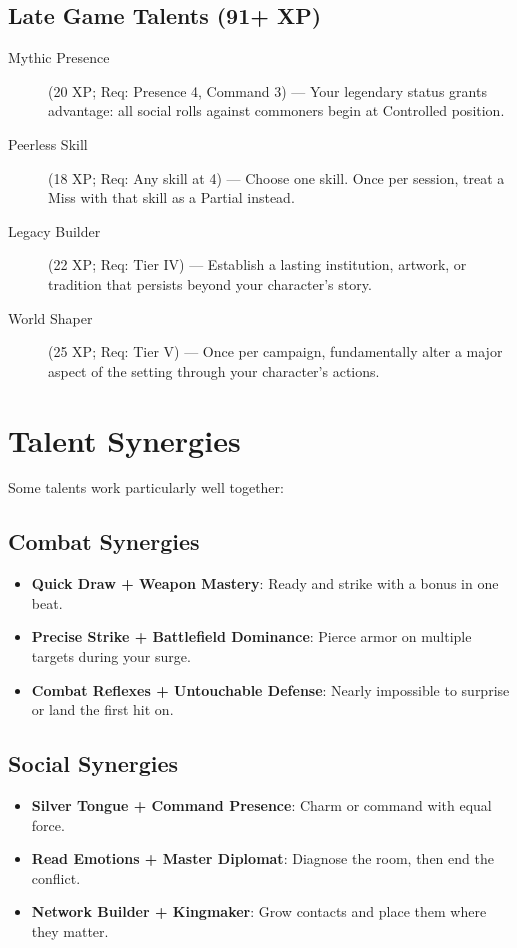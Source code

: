 \subsection*{Late Game Talents (91+ XP)}
\begin{description}
\item[Mythic Presence] (20 XP; Req: Presence 4, Command 3) --- Your legendary status grants advantage: all social rolls against commoners begin at Controlled position.
\item[Peerless Skill] (18 XP; Req: Any skill at 4) --- Choose one skill. Once per session, treat a Miss with that skill as a Partial instead.
\item[Legacy Builder] (22 XP; Req: Tier IV) --- Establish a lasting institution, artwork, or tradition that persists beyond your character's story.
\item[World Shaper] (25 XP; Req: Tier V) --- Once per campaign, fundamentally alter a major aspect of the setting through your character's actions.
\end{description}

\section{Talent Synergies}

Some talents work particularly well together:

\subsection*{Combat Synergies}
\begin{itemize}
\item \textbf{Quick Draw + Weapon Mastery}: Ready and strike with a bonus in one beat.
\item \textbf{Precise Strike + Battlefield Dominance}: Pierce armor on multiple targets during your surge.
\item \textbf{Combat Reflexes + Untouchable Defense}: Nearly impossible to surprise or land the first hit on.
\end{itemize}

\subsection*{Social Synergies}
\begin{itemize}
\item \textbf{Silver Tongue + Command Presence}: Charm or command with equal force.
\item \textbf{Read Emotions + Master Diplomat}: Diagnose the room, then end the conflict.
\item \textbf{Network Builder + Kingmaker}: Grow contacts and place them where they matter.
\end{itemize}

